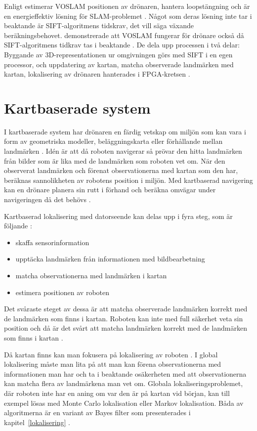 Enligt \cite{voslam} estimerar VOSLAM positionen av drönaren, hantera loopstängning och är en energieffektiv lösning för SLAM-problemet \citep{voslam}. Något som deras lösning inte tar i beaktande är SIFT-algoritmens tidskrav, det vill säga växande beräkningsbehovet. \cite{voslamlatif} demonstrerade att VOSLAM fungerar för drönare också då SIFT-algoritmens tidkrav tas i beaktande \citep{voslamlatif}. De dela upp processen i två delar: Byggande av 3D-representationen ur omgivningen görs med SIFT i en egen processor, och uppdatering av kartan, matcha observerade landmärken med kartan, lokalisering av drönaren hanterades i FPGA-kretsen \citep{voslamlatif}.

\section{Kartbaserade system}

I kartbaserade system har drönaren en färdig vetskap om miljön som kan vara i form av geometriska modeller, beläggningskarta eller förhållande mellan landmärken \citep{982903}. Idén är att då roboten navigerar så prövar den hitta landmärken från bilder som är lika med de landmärken som roboten vet om. När den observerat landmärken och förenat observationerna med kartan som den har, beräknas sannolikheten av robotens position i miljön. Med kartbaserad navigering kan en drönare planera sin rutt i förhand och beräkna omvägar under navigeringen då det behövs \citep{geospatial}. 

Kartbaserad lokalisering med datorseende kan delas upp i fyra steg, som är följande \citep{982903}:

\begin{itemize}
    \item skaffa sensorinformation
    \item upptäcka landmärken från informationen med bildbearbetning
    \item matcha observationerna med landmärken i kartan
    \item estimera positionen av roboten
\end{itemize}

Det svåraste steget av dessa är att matcha observerade landmärken korrekt med de landmärken som finns i kartan. Roboten kan inte med full säkerhet veta sin position och då är det svårt att matcha landmärken korrekt med de landmärken som finns i kartan \citep{982903}.

Då kartan finns kan man fokusera på lokalisering av roboten \citep{982903}. I global lokalisering måste man lita på att man kan förena observationerna med informationen man har och ta i beaktande osäkerheten med att observationerna kan matcha flera av landmärkena man vet om. Globala lokaliseringsproblemet, där roboten inte har en aning om var den är på kartan vid början, kan till exempel lösas med Monte Carlo lokalisation eller Markov lokalisation. Båda av algoritmerna är en variant av Bayes filter som presenterades i kapitel~\ref{lokalisering} \citep{ProbabilisticRobotics}. 

